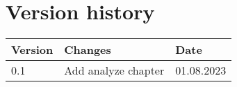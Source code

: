 \chapter{Version history}
\label{chap:report-versions}

\begin{tabular}{|m{}|m{}|m{}|}
 \hline
 \textbf{Version} & \textbf{Changes} & \textbf{Date} \\ [0.5ex]
 \hline
 0.1 & Add analyze chapter & 01.08.2023  \\
 \hline
\end{tabular}